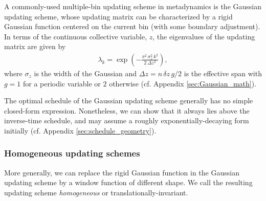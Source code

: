 \documentclass[preprint, superscriptaddress, floatfix]{revtex4-1}
\begin{document}
A commonly-used multiple-bin updating scheme in metadynamics
is the Gaussian updating scheme,
whose updating matrix can be characterized by
a rigid Gaussian function centered on the current bin
(with some boundary adjustment).
%
In terms of the continuous collective variable, $z$,
the eigenvalues of the updating matrix are given by\cite{bussi2006}
\begin{align}
  \lambda_k
  =
  \exp\left(
        -
        \frac{ \pi^2 \, \sigma_z^2 \, k^2 }
             { 2 \, \Delta z^2 }
      \right)
  ,
  \label{eq:lambda_Gaussian}
\end{align}
where $\sigma_z$ is the width of the Gaussian
and $\Delta z = n \, \delta z \, g/2$
is the effective span
with $g = 1$ for a periodic variable or $2$ otherwise
(cf. Appendix \ref{sec:Gaussian_math}).

The optimal schedule of the Gaussian updating scheme
generally has no simple closed-form expression.
Nonetheless, we can show that it always lies above
the inverse-time schedule,
and may assume a roughly exponentially-decaying form
initially (cf. Appendix \ref{sec:schedule_geometry}).




\subsubsection{\label{sec:homo_scheme}
Homogeneous updating schemes}


More generally, we can replace the rigid Gaussian function
in the Gaussian updating scheme
by a window function of different shape.
%
We call the resulting updating scheme
\emph{homogeneous} or
translationally-invariant.
\end{document}
